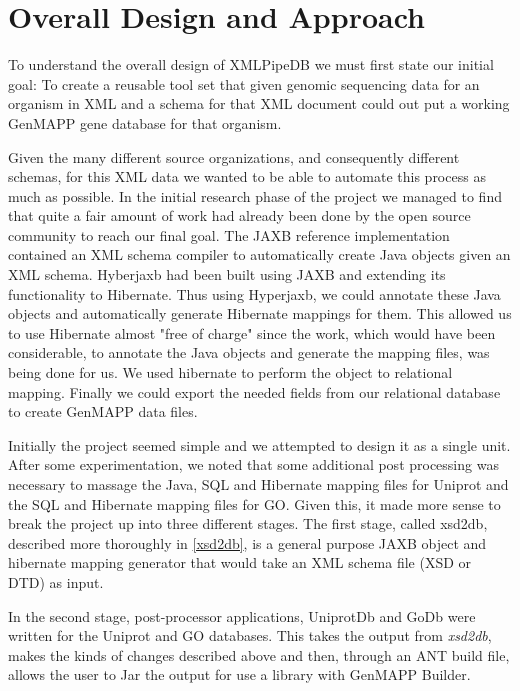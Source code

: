 \section{Overall Design and Approach}
\label{design}
To understand the overall design of XMLPipeDB we must first state our initial 
goal:  To create a reusable tool set that given genomic sequencing data for 
an organism in XML and a schema for that XML document could out put a working 
GenMAPP gene database for that organism.  

Given the many different source organizations, and consequently different schemas,  for this XML data we wanted to be able to automate this process as much as possible.  In the initial research phase of the project we managed to find that quite a fair amount of work had already been done by the open source community to reach our final goal.  The JAXB reference implementation contained an XML schema compiler to automatically create Java objects given an XML schema. Hyberjaxb had been built using JAXB and extending its functionality to Hibernate. Thus using Hyperjaxb, we could annotate these Java objects and automatically generate Hibernate mappings for them. This allowed us to use Hibernate almost "free of charge" since the work, which would have been considerable, to annotate the Java objects and generate the mapping files, was being done for us. We used hibernate to perform the object to relational mapping. Finally we could export the needed fields from our relational database to create GenMAPP data files. 

Initially the project seemed simple and we attempted to design it as a single unit. After some experimentation, we noted that some additional post processing was necessary to massage the Java, SQL and Hibernate mapping files for Uniprot and the SQL and Hibernate mapping files for GO. Given this, it made more sense to break the project up into three different stages.  The first stage, called xsd2db, described more thoroughly in \ref{xsd2db}, is a general purpose JAXB object and hibernate mapping generator that would take an XML schema file (XSD or DTD) as input.   


In the second stage, post-processor applications, UniprotDb and GoDb were written for the Uniprot and GO databases. This takes the output from \emph{xsd2db}, makes the kinds of changes described above and then, through an ANT build file, allows the user to Jar the output for use a library with GenMAPP Builder.

